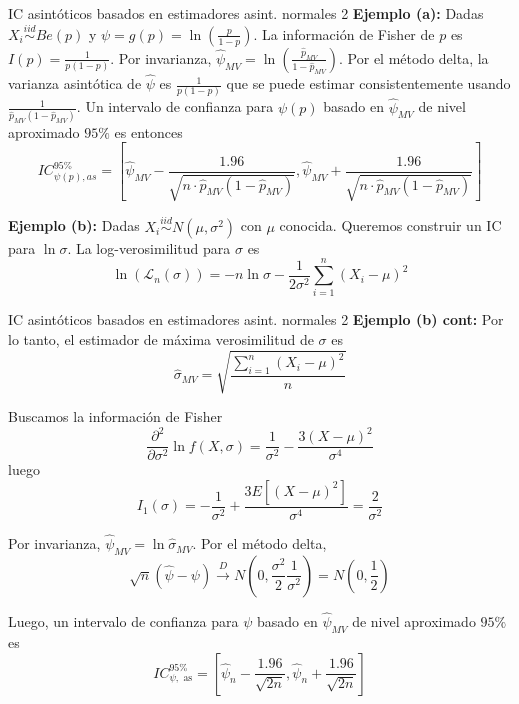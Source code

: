 \documentclass{beamer}
\theoremstyle{definition}
\begin{document}
\begin{frame}{\color{rosee}IC asint\'oticos basados en estimadores asint. normales 2}\small
  \textbf{Ejemplo (a):}
    Dadas $X_i \stackrel{iid}{\sim}Be(p)$ y
    $\psi = g(p) = \ln\left(\frac{p}{1-p}\right)$. La informaci\'on de Fisher de $p$ es
    $I(p)=\frac{1}{p(1-p)}$. 
	Por invarianza, 
    $\widehat{\psi}_{MV}=\ln \left(\frac{\widehat{p}_{MV}}{1-\widehat{p}_{MV}}\right)$. Por el m\'etodo
    delta, la varianza asintótica de $\widehat{\psi}$ es $\frac{1}{p(1-p)}$ que se puede estimar consistentemente usando $
        \frac{1}{\widehat{p}_{MV}(1-\widehat{p}_{MV})}$.
    Un intervalo de confianza para $\psi(p)$ basado en $\widehat{\psi}_{MV}$ de nivel aproximado $95\%$ es entonces
    \[ IC_{\psi(p), as}^{95\%}=\left[\widehat{\psi}_{MV} -\frac{1.96}{\sqrt{n \cdot 
          \widehat{p}_{MV}(1-\widehat{p}_{MV})}},\widehat{\psi}_{MV} + \frac{1.96}{\sqrt{n \cdot 
          \widehat{p}_{MV}(1-\widehat{p}_{MV})}}\right]\]

     \textbf{Ejemplo (b):} Dadas $X_i \stackrel{iid}{\sim} N(\mu,\sigma^2)$ con $\mu$
    conocida. Queremos construir un IC para $\ln\sigma$. La
    log-verosimilitud para $\sigma$ es
    \[\ln(\mathcal{L}_{n}(\sigma)) = -n\ln\sigma - \frac{1}{2\sigma^2}\sum_{i=1}^n(X_i-\mu)^2\]

\end{frame}


\begin{frame}{\color{rosee}IC asint\'oticos basados en estimadores asint. normales 2}\small
 \textbf{Ejemplo (b) cont:}  Por lo tanto, el estimador de máxima verosimilitud de $\sigma$ es
    \[\widehat{\sigma}_{MV} = \sqrt{\frac{\sum_{i=1}^n (X_i-\mu)^2}{n}}\]
    
    Buscamos la informaci\'on de Fisher
    \[\dfrac{\partial^2}{\partial \sigma^2}\ln f(X,\sigma)=\frac{1}{\sigma^2} - \frac{3(X-\mu)^2}{\sigma^4}\]
    luego
    \[I_{1}(\sigma) = -\frac{1}{\sigma^2} + \frac{3E\left[ (X-\mu)^2 \right]}{\sigma^4} =
      \frac{2}{\sigma^2}\]

Por invarianza, 
    $\widehat{\psi}_{MV} =\ln\widehat{\sigma}_{MV}$. Por el método delta, 
    \[\sqrt{n}\left(\widehat{\psi}-\psi\right)\stackrel{D}{\to} N\left(0,\frac{\sigma^{2}}{2} \frac{1}{\sigma^{2}}\right)=N\left(0, \frac{1}{2}\right)\]

Luego, un intervalo de confianza para $\psi$ basado en $\widehat{\psi}_{MV}$ de nivel aproximado $95\%$ es
      \[IC_{\psi, \text{ as}}^{95\%}=\left[\widehat{\psi}_n -\frac{1.96}{\sqrt{2n}},\widehat{\psi}_n + \frac{1.96}{\sqrt{2n}}\right]\]
  
\end{frame}
\end{document}
